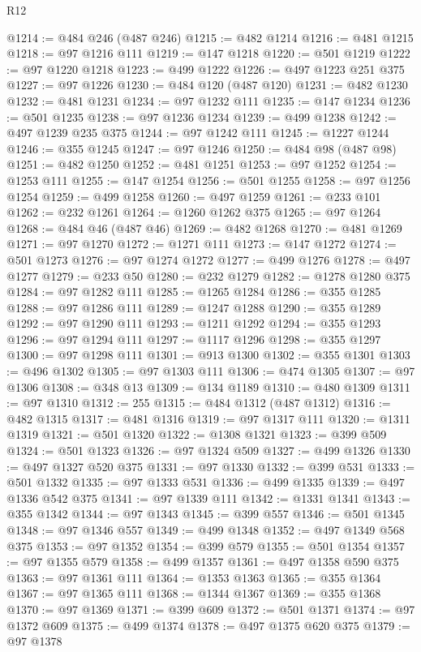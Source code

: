 \begin{lexlean}{R12}
\begin{coremodule}
{{{{{{{{{{{{{{{{{{{{{{{{{{{{{{{{{{{{{{{{{{{{{{{{{{{{{{{{{{{{{{{{{{{{{{{{{{{{{{{{{{@1214 := @484 @246 (@487 @246)
@1215 := @482 @1214
@1216 := @481 @1215
@1218 := @97 @1216 @111
@1219 := @147 @1218
@1220 := @501 @1219
@1222 := @97 @1220 @1218
@1223 := @499 @1222
@1226 := @497 @1223 @251 @375
@1227 := @97 @1226
@1230 := @484 @120 (@487 @120)
@1231 := @482 @1230
@1232 := @481 @1231
@1234 := @97 @1232 @111
@1235 := @147 @1234
@1236 := @501 @1235
@1238 := @97 @1236 @1234
@1239 := @499 @1238
@1242 := @497 @1239 @235 @375
@1244 := @97 @1242 @111
@1245 := @1227 @1244
@1246 := @355 @1245
@1247 := @97 @1246
@1250 := @484 @98 (@487 @98)
@1251 := @482 @1250
@1252 := @481 @1251
@1253 := @97 @1252
@1254 := @1253 @111
@1255 := @147 @1254
@1256 := @501 @1255
@1258 := @97 @1256 @1254
@1259 := @499 @1258
@1260 := @497 @1259
@1261 := @233 @101
@1262 := @232 @1261
@1264 := @1260 @1262 @375
@1265 := @97 @1264
@1268 := @484 @46 (@487 @46)
@1269 := @482 @1268
@1270 := @481 @1269
@1271 := @97 @1270
@1272 := @1271 @111
@1273 := @147 @1272
@1274 := @501 @1273
@1276 := @97 @1274 @1272
@1277 := @499 @1276
@1278 := @497 @1277
@1279 := @233 @50
@1280 := @232 @1279
@1282 := @1278 @1280 @375
@1284 := @97 @1282 @111
@1285 := @1265 @1284
@1286 := @355 @1285
@1288 := @97 @1286 @111
@1289 := @1247 @1288
@1290 := @355 @1289
@1292 := @97 @1290 @111
@1293 := @1211 @1292
@1294 := @355 @1293
@1296 := @97 @1294 @111
@1297 := @1117 @1296
@1298 := @355 @1297
@1300 := @97 @1298 @111
@1301 := @913 @1300
@1302 := @355 @1301
@1303 := @496 @1302
@1305 := @97 @1303 @111
@1306 := @474 @1305
@1307 := @97 @1306
@1308 := @348 @13
@1309 := @134 @1189
@1310 := @480 @1309
@1311 := @97 @1310
@1312 := 255
@1315 := @484 @1312 (@487 @1312)
@1316 := @482 @1315
@1317 := @481 @1316
@1319 := @97 @1317 @111
@1320 := @1311 @1319
@1321 := @501 @1320
@1322 := @1308 @1321
@1323 := @399 @509
@1324 := @501 @1323
@1326 := @97 @1324 @509
@1327 := @499 @1326
@1330 := @497 @1327 @520 @375
@1331 := @97 @1330
@1332 := @399 @531
@1333 := @501 @1332
@1335 := @97 @1333 @531
@1336 := @499 @1335
@1339 := @497 @1336 @542 @375
@1341 := @97 @1339 @111
@1342 := @1331 @1341
@1343 := @355 @1342
@1344 := @97 @1343
@1345 := @399 @557
@1346 := @501 @1345
@1348 := @97 @1346 @557
@1349 := @499 @1348
@1352 := @497 @1349 @568 @375
@1353 := @97 @1352
@1354 := @399 @579
@1355 := @501 @1354
@1357 := @97 @1355 @579
@1358 := @499 @1357
@1361 := @497 @1358 @590 @375
@1363 := @97 @1361 @111
@1364 := @1353 @1363
@1365 := @355 @1364
@1367 := @97 @1365 @111
@1368 := @1344 @1367
@1369 := @355 @1368
@1370 := @97 @1369
@1371 := @399 @609
@1372 := @501 @1371
@1374 := @97 @1372 @609
@1375 := @499 @1374
@1378 := @497 @1375 @620 @375
@1379 := @97 @1378
}}}}}}}}}}}}}}}}}}}}}}}}}}}}}}}}}}}}}}}}}}}}}}}}}}}}}}}}}}}}}}}}}}}}}}}}}}}}}}}}}}
\end{coremodule}
\end{lexlean}
